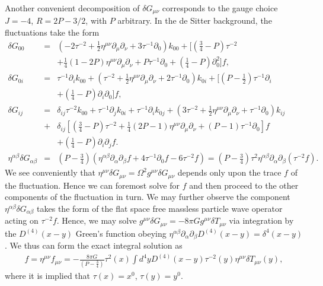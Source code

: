 Another convenient decomposition of $\delta G_{\mu\nu}$ corresponds to the gauge choice $J=-4$, $R=2P-3/2$, with $P$ arbitrary. In the de Sitter background, the fluctuations take the form
%
\begin{eqnarray}
\delta G_{00}&=&(-2 \tau^{-2}
+ \tfrac{1}{2} \eta^{\mu \nu} \partial_{\mu} \partial_{\nu}
+ 3 \tau^{-1} \partial_{0}) k_{00}
+ \big[(\tfrac{3}{4} -  P) \tau^{-2} 
\nonumber\\
&&
+ \tfrac{1}{4}(1-2P) \eta^{\mu \nu} \partial_{\mu} \partial_{\nu}
+ P \tau^{-1} \partial_{0}
+( \tfrac{1}{4} -P)\partial^2_{0}\big]f,
\nonumber\\
\delta G_{0i}&=&\tau^{-1} \partial_{i} k_{00}
+ (\tau^{-2}
+ \tfrac{1}{2} \eta^{\mu \nu} \partial_{\mu} \partial_{\nu}
+ 2 \tau^{-1} \partial_{0}) k_{0i}
+ \big[(P- \tfrac{1}{2}) \tau^{-1} \partial_{i} 
\nonumber\\
&&
+ (\tfrac{1}{4}-P) \partial_{i} \partial_{0} \big]f,
\nonumber\\
\delta G_{ij}&=&\delta_{ij}\tau^{-2} k_{00}
+\tau^{-1} \partial_{j} k_{0i}
+ \tau^{-1} \partial_{i} k_{0j}
+ (3 \tau^{-2}
+ \tfrac{1}{2} \eta^{\mu \nu} \partial_{\mu} \partial_{\nu}
+ \tau^{-1} \partial_{0}) k_{ij}
\nonumber\\
&+& \delta_{ij}\left[(\tfrac{3}{4}-P) \tau^{-2}
+ \tfrac{1}{4}(2P-1) \eta^{\mu \nu} \partial_{\mu} \partial_{\nu}
+(P-1)\tau^{-1} \partial_{0}\right]f 
\nonumber\\
&&
+ (\tfrac{1}{4}-P) \partial_{i} \partial_{j}f.
\\
\eta^{\alpha\beta}\delta G_{\alpha\beta}&=&(P-\tfrac{3}{4})( \eta^{\alpha\beta}\partial_{\alpha}\partial_{\beta}f +4\tau^{-1}\partial_0 f-6\tau^{-2}f)=(P-\tfrac{3}{4})\tau^2 \eta^{\alpha\beta}\partial_{\alpha}\partial_{\beta}(\tau^{-2}f).
\nonumber
\label{D6}
\end{eqnarray}
%
We see conveniently that $\eta^{\mu\nu}\delta G_{\mu\nu}=\Omega^2g^{\mu\nu}\delta G_{\mu\nu}$ depends only upon the trace $f$ of the fluctuation. Hence we can foremost solve for $f$ and then proceed to the other components of the fluctuation in turn. We may further observe the component $\eta^{\alpha\beta}\delta G_{\alpha\beta}$ takes the form of the flat space free massless particle wave operator acting on $\tau^{-2} f$. Hence, we may solve $g^{\mu\nu}\delta G_{\mu\nu}=-8\pi G g^{\mu\nu}\delta T_{\mu\nu}$ via integration by the $D^{(4)}(x-y)$ Green's function obeying $\eta^{\alpha\beta}\partial_{\alpha}\partial_{\beta}D^{(4)}(x-y)=\delta^4(x-y)$. We thus can form the exact integral solution as
%
\begin{eqnarray}
f=\eta^{\mu\nu}f_{\mu\nu}=-\frac{8\pi G}{(P-\tfrac{3}{4})}\tau^2(x) \int d^4yD^{(4)}(x-y)\tau^{-2}(y)\eta^{\mu\nu}\delta T_{\mu\nu}(y),
\label{D7}
\end{eqnarray}
%
where it is implied that $\tau(x)=x^0$, $\tau(y)=y^0$.

